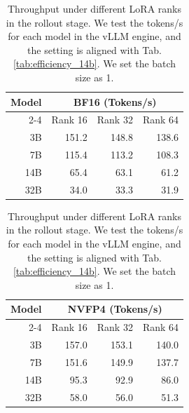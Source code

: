 \begin{table}[!t]
\centering
\begin{minipage}{0.45\textwidth} 
\begin{tabular}{rrrr}
\toprule
\textbf{Model} & \multicolumn{3}{c}{\textbf{BF16 (Tokens/s)}}\\ 
\cmidrule(lr){2-4}
               & Rank 16 & Rank 32 & Rank 64\\ 
\midrule
3B    & 151.2  & 148.8  & 138.6\\ 
7B    & 115.4 & 113.2 & 108.3\\ 
14B   & 65.4 & 63.1 & 61.2 \\ 
32B   & 34.0 & 33.3 & 31.9 \\ 
\bottomrule
\end{tabular}
\label{tab:example_table}
\end{minipage}%
\hfill %
\begin{minipage}{0.45\textwidth}
\begin{tabular}{rrrr}
\toprule
\textbf{Model}& \multicolumn{3}{c}{\textbf{NVFP4 (Tokens/s)}}\\ 
\cmidrule(lr){2-4}
    & Rank 16 & Rank 32 & Rank 64\\ 
\midrule
3B     & 157.0  & 153.1  & 140.0\\ 
7B     & 151.6 & 149.9 & 137.7\\ 
14B    & 95.3 & 92.9 & 86.0 \\ 
32B    & 58.0 & 56.0 & 51.3 \\ 
\bottomrule
\end{tabular}
\end{minipage}%
\caption{Throughput under different LoRA ranks in the rollout stage. We test the tokens/s for each model in the vLLM engine, and the setting is aligned with Tab.\ref{tab:efficiency_14b}. We set the batch size as 1.}
\label{tab:throughput_rank}
\end{table}


